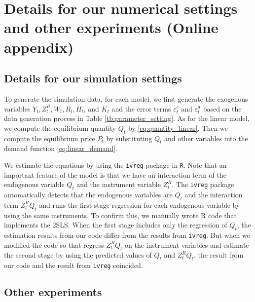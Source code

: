 \documentclass[11pt, a4paper]{article}
\begin{document}
\section{Details for our numerical settings and other experiments (Online appendix)}\label{sec:appendix}

\subsection{Details for our simulation settings}

To generate the simulation data, for each model, we first generate the exogenous variables $Y_t, Z^{R}_{t}, W_t, R_{t}, H_t$, and $K_t$ and the error terms $\varepsilon_{t}^c$ and $\varepsilon_{t}^d$ based on the data generation process in Table \ref{tb:parameter_setting}.
As for the linear model, we compute the equilibrium quantity $Q_{t}$ by \eqref{eq:quantity_linear}.
Then we compute the equilibrium price $P_t$ by substituting $Q_{t}$ and other variables into the demand function \eqref{eq:linear_demand}.

We estimate the equations by using the \texttt{ivreg} package in \texttt{R}.
Note that an important feature of the model is that we have an interaction term of the endogenous variable $Q_{t}$ and the instrument variable $Z^{R}_{t}$.
The \texttt{ivreg} package automatically detects that the endogenous variables are $Q_{t}$ and the interaction term $Z^{R}_{t}Q_{t}$ and runs the first stage regression for each endogenous variable by using the same instruments. To confirm this, we manually wrote R code that implements the 2SLS. 
When the first stage includes only the regression of $Q_{t}$, the estimation results from our code differ from the results from \texttt{ivreg}. 
But when we modified the code so that regress $Z^{R}_{t}Q_{t}$ on the instrument variables and estimate the second stage by using the predicted values of $Q_{t}$ and $Z^{R}_{t}Q_{t}$, the result from our code and the result from \texttt{ivreg} coincided.


\subsection{Other experiments}
\end{document}
